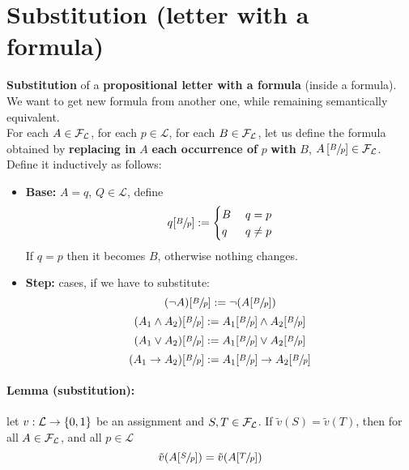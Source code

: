 	\section{Substitution (letter with a formula)}

	\textbf{Substitution} of a \textbf{propositional letter with a formula} (inside a formula). We want to get new formula from another one, while remaining semantically equivalent.\\


	For each $A \in \mathcal{F}_\mathcal{L}$, for each $p \in \mathcal{L}$, for each $B \in \mathcal{F}_\mathcal{L}$, let us define the formula obtained by \textbf{replacing in} $A$ \textbf{each occurrence of} $p$ \textbf{with} $B$, $A\left[\sfrac{B}{p}\right] \in \mathcal{F}_\mathcal{L}$. Define it inductively as follows:
	\begin{itemize}
		\item \textbf{Base:} $A = q$, $Q \in \mathcal{L}$, define
		$$q[\sfrac{B}{p}] := \begin{cases}
			B \; & q = p  \\
			q \;  & q \neq p
		\end{cases}
		$$
		If $q=p$ then it becomes $B$, otherwise nothing changes.

		\item \textbf{Step:} cases, if we have to substitute:
		$$ (\neg A)[\sfrac{B}{p}] := \neg(A[\sfrac{B}{p}]) $$
		$$ (A_1 \wedge A_2) [\sfrac{B}{p}] := A_1 [\sfrac{B}{p}] \wedge A_2 [\sfrac{B}{p}] $$
		$$ (A_1 \vee A_2) [\sfrac{B}{p}] := A_1 [\sfrac{B}{p}] \vee A_2 [\sfrac{B}{p}] $$
		$$ (A_1 \rightarrow A_2) [\sfrac{B}{p}] := A_1 [\sfrac{B}{p}] \rightarrow A_2 [\sfrac{B}{p}] $$
	\end{itemize}

	\newpage

	\paragraph{Lemma (substitution):} let $v: \mathcal{L} \rightarrow \{0,1\}$ be an assignment and $S,T \in \mathcal{F}_\mathcal{L}$. If $\tilde{v}(S) = \tilde{v} (T)$, then for all $A \in \mathcal{F}_\mathcal{L}$, and all $p \in \mathcal{L}$
	$$ \tilde{v} (A [\sfrac{S}{p}]) = \tilde{v} (A[\sfrac{T}{p}]) $$

